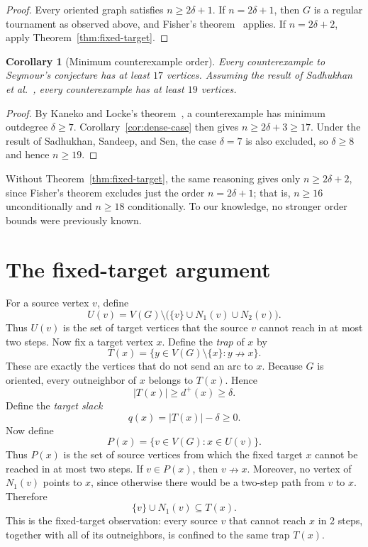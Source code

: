 \documentclass[12pt]{article}
\theoremstyle{plainsl}
\newtheorem{corollary}[theorem]{Corollary}
\theoremstyle{remark}
\begin{document}
\begin{proof}
Every oriented graph satisfies $n\ge2\delta+1$.  If $n=2\delta+1$, then $G$
is a regular tournament as observed above, and Fisher's
theorem~\cite{Fisher1996} applies.  If $n=2\delta+2$, apply
Theorem~\ref{thm:fixed-target}.
\end{proof}

\begin{corollary}[Minimum counterexample order]\label{cor:counterexample-order}
Every counterexample to Seymour's conjecture has at least $17$ vertices.
Assuming the result of Sadhukhan et al.~\cite{SadhukhanSandeepSen2026}, every
counterexample has at least $19$ vertices.
\end{corollary}

\begin{proof}
By Kaneko and Locke's theorem~\cite{KanekoLocke2001}, a counterexample has
minimum outdegree $\delta\ge7$.  Corollary~\ref{cor:dense-case} then gives
$n\ge2\delta+3\ge17$.  Under the result of Sadhukhan, Sandeep, and Sen, the
case $\delta=7$ is also excluded, so $\delta\ge8$ and hence $n\ge19$.
\end{proof}

Without Theorem~\ref{thm:fixed-target}, the same reasoning gives only
$n\ge2\delta+2$, since Fisher's theorem excludes just the order $n=2\delta+1$;
that is, $n\ge16$ unconditionally and $n\ge18$ conditionally.  To our
knowledge, no stronger order bounds were previously known.

\section{The fixed-target argument}

For a source vertex $v$, define
\[
 U(v)=V(G)\setminus\bigl(\{v\}\cup N_1(v)\cup N_2(v)\bigr).
\]
Thus $U(v)$ is the set of target vertices that the source $v$ cannot reach in
at most two steps. Now fix a target vertex $x$.  Define the \emph{trap} of $x$ by
\[
 T(x)=\{y\in V(G)\setminus\{x\}:y\nrightarrow x\}.
\]
These are exactly the vertices that do not send an arc to $x$.  Because $G$
is oriented, every outneighbor of $x$ belongs to $T(x)$.  Hence
\[
 |T(x)|\ge d^+(x)\ge\delta.
\]
Define the \emph{target slack}
\[
 q(x)=|T(x)|-\delta\ge0.
\]
Now define
\[
 P(x)=\{v\in V(G):x\in U(v)\}.
\]
Thus $P(x)$ is the set of source vertices from which the fixed target $x$
cannot be reached in at most two steps.  If $v\in P(x)$, then $v\nrightarrow
x$.  Moreover, no vertex of $N_1(v)$ points to $x$, since otherwise there
would be a two-step path from $v$ to $x$.  Therefore
\begin{equation}\label{eq:trap}
 \{v\}\cup N_1(v)\subseteq T(x).
\end{equation}
This is the fixed-target observation: every source $v$ that cannot reach $x$ in 2 steps, together with
all of its outneighbors, is confined to the same trap $T(x)$.
\end{document}

